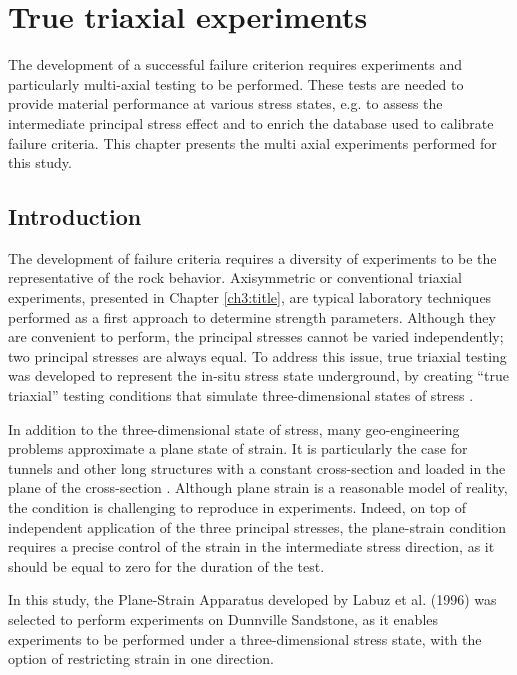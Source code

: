 \chapter{True triaxial experiments}\label{ch4:title}

The development of a successful failure criterion requires experiments and particularly multi-axial testing \cite{Labuz2018} to be performed. These tests are needed to provide material performance at various stress states, e.g. to assess the intermediate principal stress effect and to enrich the database used to calibrate failure criteria. This chapter presents the multi axial experiments performed for this study. 


\section{Introduction}

The development of failure criteria requires a diversity of experiments to be the representative of the rock behavior. Axisymmetric or conventional triaxial experiments, presented in Chapter \ref{ch3:title}, are typical laboratory techniques performed as a first approach to determine strength parameters. Although they are convenient to perform, the principal stresses cannot be varied independently; two principal stresses are always equal. To address this issue, true triaxial testing was developed to represent the in-situ stress state underground, by creating “true triaxial” testing conditions that simulate three-dimensional states of stress \cite{Labuz2018} .

In addition to the three-dimensional state of stress, many geo-engineering problems approximate a plane state of strain. It is particularly the case for tunnels and other long structures with a constant cross-section and loaded in the plane of the cross-section \cite{Jaeger1979}. Although plane strain is a reasonable model of reality, the condition is challenging to reproduce in experiments. Indeed, on top of independent application of the three principal stresses, the plane-strain condition requires a precise control of the strain in the intermediate stress direction, as it should be equal to zero for the duration of the test. 

In this study, the Plane-Strain Apparatus developed by Labuz et al. (1996) \cite{Labuz1996} was selected to perform experiments on Dunnville Sandstone, as it enables experiments to be performed under a three-dimensional stress state, with the option of restricting strain in one direction.

